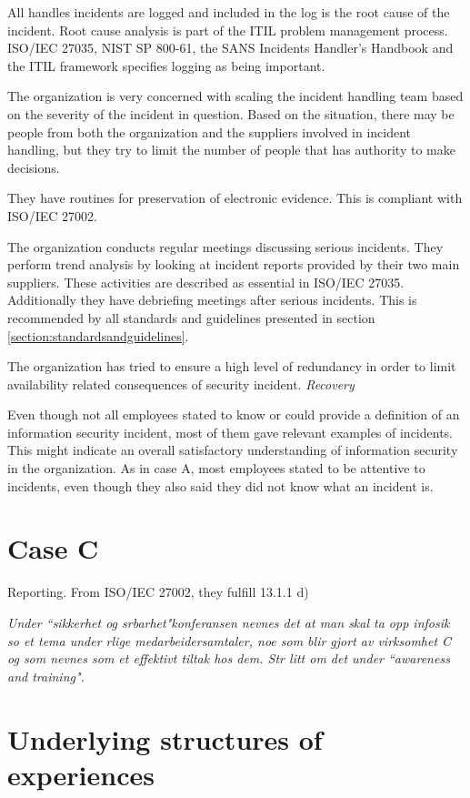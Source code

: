All handles incidents are logged and included in the log is the root cause of the incident. Root cause analysis is part of the ITIL problem management process. ISO/IEC 27035, NIST SP 800-61, the SANS Incidents Handler's Handbook and the ITIL framework specifies logging as being important.

The organization is very concerned with scaling the incident handling team based on the severity of the incident in question. Based on the situation, there may be people from both the organization and the suppliers involved in incident handling, but they try to limit the number of people that has authority to make decisions.

They have routines for preservation of electronic evidence. This is compliant with ISO/IEC 27002. 

The organization conducts regular meetings discussing serious incidents. They perform trend analysis by looking at incident reports provided by their two main suppliers. These activities are described as essential in ISO/IEC 27035. Additionally they have debriefing meetings after serious incidents. This is recommended by all standards and guidelines presented in section \ref{section:standardsandguidelines}.

The organization has tried to ensure a high level of redundancy in order to limit availability related consequences of security incident. \textit{Recovery}

Even though not all employees stated to know or could provide a definition of an information security incident, most of them gave relevant examples of incidents. This might indicate an overall satisfactory understanding of information security in the organization. As in case A, most employees stated to be attentive to incidents, even though they also said they did not know what an incident is. 

\section{Case C}

Reporting. From ISO/IEC 27002, they fulfill 13.1.1 d)

\textit{Under ``sikkerhet og srbarhet"konferansen nevnes det at man skal ta opp infosik so et tema under rlige medarbeidersamtaler, noe som blir gjort av virksomhet C og som nevnes som et effektivt tiltak hos dem. Str litt om det under ``awareness and training".}

\section{Underlying structures of experiences}
